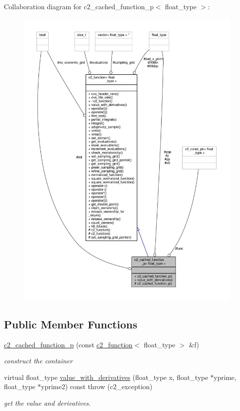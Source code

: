 Collaboration diagram for c2\+\_\+cached\+\_\+function\+\_\+p$<$ float\+\_\+type $>$\+:
\nopagebreak
\begin{figure}[H]
\begin{center}
\leavevmode
\includegraphics[width=350pt]{classc2__cached__function__p__coll__graph}
\end{center}
\end{figure}
\subsection*{Public Member Functions}
\begin{DoxyCompactItemize}
\item 
\hyperlink{classc2__cached__function__p_aac798ef75eb219dbf64a35fed575f217}{c2\+\_\+cached\+\_\+function\+\_\+p} (const \hyperlink{classc2__function}{c2\+\_\+function}$<$ float\+\_\+type $>$ \&f)
\begin{DoxyCompactList}\small\item\em construct the container \end{DoxyCompactList}\item 
virtual float\+\_\+type \hyperlink{classc2__cached__function__p_a09f22efcdcf81c1a7b353d10e29b193c}{value\+\_\+with\+\_\+derivatives} (float\+\_\+type x, float\+\_\+type $\ast$yprime, float\+\_\+type $\ast$yprime2) const   throw (c2\+\_\+exception)
\begin{DoxyCompactList}\small\item\em get the value and derivatives. \end{DoxyCompactList}\end{DoxyCompactItemize}
